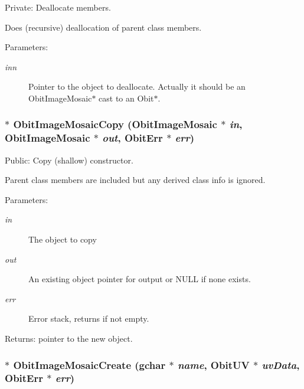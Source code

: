 Private: Deallocate members. 

Does (recursive) deallocation of parent class members. \begin{Desc}
\item[Parameters:]
\begin{description}
\item[{\em inn}]Pointer to the object to deallocate. Actually it should be an Obit\-Image\-Mosaic$\ast$ cast to an Obit$\ast$. \end{description}
\end{Desc}
\subsubsection{$\ast$ Obit\-Image\-Mosaic\-Copy ({\bf Obit\-Image\-Mosaic} $\ast$ {\em in}, {\bf Obit\-Image\-Mosaic} $\ast$ {\em out}, {\bf Obit\-Err} $\ast$ {\em err})}\label{ObitImageMosaic_8c_a20}


Public: Copy (shallow) constructor. 

Parent class members are included but any derived class info is ignored. \begin{Desc}
\item[Parameters:]
\begin{description}
\item[{\em in}]The object to copy \item[{\em out}]An existing object pointer for output or NULL if none exists. \item[{\em err}]Error stack, returns if not empty. \end{description}
\end{Desc}
\begin{Desc}
\item[Returns:]pointer to the new object. \end{Desc}
\subsubsection{$\ast$ Obit\-Image\-Mosaic\-Create (gchar $\ast$ {\em name}, {\bf Obit\-UV} $\ast$ {\em uv\-Data}, {\bf Obit\-Err} $\ast$ {\em err})}\label{ObitImageMosaic_8c_a22}



